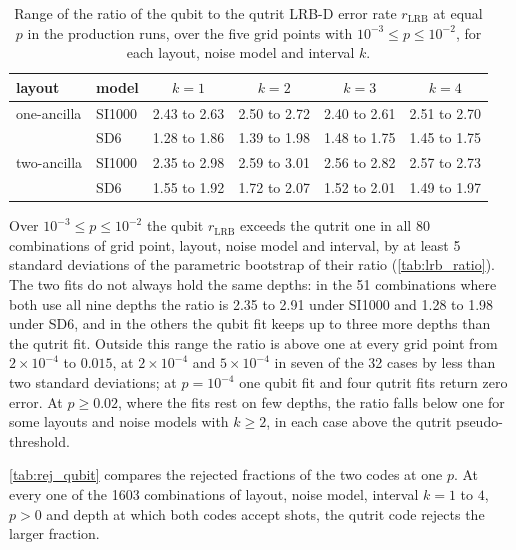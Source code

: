 \begin{table}[tp]
  \centering
  \small
  \begin{tabular}{ll|cccc}
    \hline
    layout & model & $k = 1$ & $k = 2$ & $k = 3$ & $k = 4$ \\
    \hline
    one-ancilla & SI1000 & 2.43 to 2.63 & 2.50 to 2.72 & 2.40 to 2.61 & 2.51 to 2.70 \\
     & SD6 & 1.28 to 1.86 & 1.39 to 1.98 & 1.48 to 1.75 & 1.45 to 1.75 \\
    two-ancilla & SI1000 & 2.35 to 2.98 & 2.59 to 3.01 & 2.56 to 2.82 & 2.57 to 2.73 \\
     & SD6 & 1.55 to 1.92 & 1.72 to 2.07 & 1.52 to 2.01 & 1.49 to 1.97 \\
    \hline
  \end{tabular}
  \caption{Range of the ratio of the qubit to the qutrit LRB-D error rate $r_{\mathrm{LRB}}$ at equal $p$ in the production runs, over the five grid points with $10^{-3} \le p \le 10^{-2}$, for each layout, noise model and interval $k$.}
  \label{tab:lrb_ratio}
\end{table}

Over $10^{-3} \le p \le 10^{-2}$ the qubit $r_{\mathrm{LRB}}$ exceeds the qutrit one in all 80 combinations of grid point, layout, noise model and interval, by at least 5 standard deviations of the parametric bootstrap of their ratio (\autoref{tab:lrb_ratio}). The two fits do not always hold the same depths: in the 51 combinations where both use all nine depths the ratio is 2.35 to 2.91 under SI1000 and 1.28 to 1.98 under SD6, and in the others the qubit fit keeps up to three more depths than the qutrit fit. Outside this range the ratio is above one at every grid point from $2\times10^{-4}$ to $0.015$, at $2\times10^{-4}$ and $5\times10^{-4}$ in seven of the 32 cases by less than two standard deviations; at $p = 10^{-4}$ one qubit fit and four qutrit fits return zero error. At $p \ge 0.02$, where the fits rest on few depths, the ratio falls below one for some layouts and noise models with $k \ge 2$, in each case above the qutrit pseudo-threshold.

\autoref{tab:rej_qubit} compares the rejected fractions of the two codes at one $p$. At every one of the 1603 combinations of layout, noise model, interval $k = 1$ to $4$, $p > 0$ and depth at which both codes accept shots, the qutrit code rejects the larger fraction.

